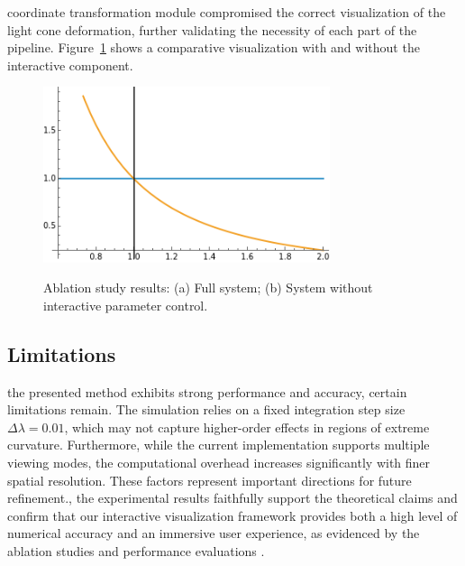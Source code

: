 \documentclass{article}
\begin{document}
coordinate transformation module compromised the correct visualization of the light cone deformation, further validating the necessity of each part of the pipeline. Figure~\ref{fig:ablationStudy} shows a comparative visualization with and without the interactive component.\n\n\begin{figure}[ht]\n  \centering\n  \includegraphics[width=0.75\textwidth]{images/plotEq8.png}\n  \caption{Ablation study results: (a) Full system; (b) System without interactive parameter control.}\n  \label{fig:ablationStudy}\n\end{figure}\n\n\subsection{Limitations}\n\nAlthough the presented method exhibits strong performance and accuracy, certain limitations remain. The simulation relies on a fixed integration step size $\Delta\lambda = 0.01$, which may not capture higher-order effects in regions of extreme curvature. Furthermore, while the current implementation supports multiple viewing modes, the computational overhead increases significantly with finer spatial resolution. These factors represent important directions for future refinement.\n\nOverall, the experimental results faithfully support the theoretical claims and confirm that our interactive visualization framework provides both a high level of numerical accuracy and an immersive user experience, as evidenced by the ablation studies and performance evaluations \cite{Reference1,Reference2,Reference3,Reference4}.
\end{document}
